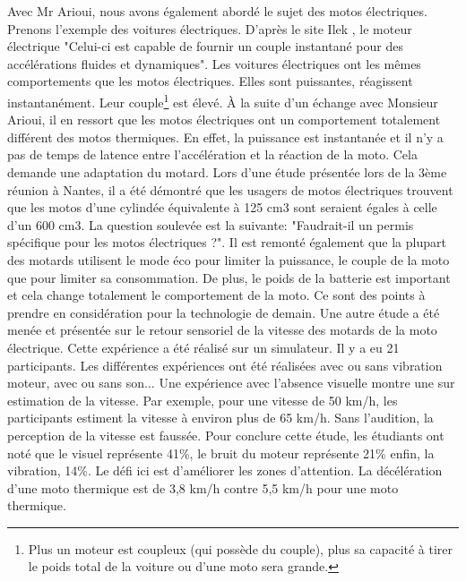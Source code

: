 Avec Mr Arioui, nous avons également abordé le sujet des motos électriques. Prenons l'exemple des voitures électriques.
D'après le site Ilek \cite{voiture_electrique}, le moteur électrique "Celui-ci est capable de fournir un couple instantané pour des accélérations fluides et dynamiques". Les voitures électriques ont les mêmes comportements que les motos électriques. Elles sont puissantes, réagissent instantanément. Leur couple\footnote{Plus un moteur est coupleux (qui possède du couple), plus sa capacité à tirer le poids total de la voiture ou d'une moto sera grande.} est élevé.
À la suite d’un échange avec Monsieur Arioui, il en ressort que les motos électriques ont un comportement totalement différent des motos thermiques. En effet, la puissance est instantanée et il n'y a pas de temps de latence entre l'accélération et la réaction de la moto. Cela demande une adaptation du motard. Lors d'une étude présentée lors de la 3ème réunion \cite{reunionProjet2025} à Nantes, il a été démontré que les usagers de motos électriques trouvent que les motos d'une cylindée équivalente à 125 cm3 sont seraient égales à celle d'un 600 cm3. La question soulevée est la suivante: "Faudrait-il un permis spécifique pour les motos électriques ?". Il est remonté également que la plupart des motards utilisent le mode éco pour limiter la puissance, le couple de la moto que pour limiter sa consommation.
De plus, le poids de la batterie est important et cela change totalement le comportement de la moto. Ce sont des points à prendre en considération pour la technologie de demain.
Une autre étude a été menée et présentée\cite{reunionProjet2025} sur le retour sensoriel de la vitesse des motards de la moto électrique. Cette expérience a été réalisé sur un simulateur. Il y a eu 21 participants. Les différentes expériences ont été réalisées avec ou sans vibration moteur, avec ou sans son... Une expérience avec l'absence visuelle montre une sur estimation de la vitesse. Par exemple, pour une vitesse de 50 km/h, les participants estiment la vitesse à environ plus de 65 km/h. Sans l'audition, la perception de la vitesse est faussée. Pour conclure cette étude, les étudiants ont noté que le visuel représente 41\%, le bruit du moteur représente 21\% enfin, la vibration, 14\%. Le défi ici est d'améliorer les zones d'attention. La décélération d'une moto thermique est de 3,8 km/h contre 5,5 km/h pour une moto thermique.
\vspace{0.5cm} %

